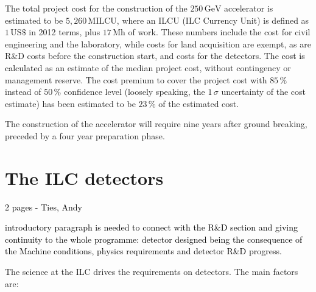 \documentclass[%
 reprint,
 amsmath,amssymb,
 aps,
]{revtex4-1}
\newcommand{\juan}[1]{\textcolor{black}{{#1}}}
\newcommand{\todo}[1]{\textcolor{black}{{#1}}}
\begin{document}
The total project cost for the construction of the $250\,{\mathrm{GeV}}$ accelerator is estimated to be $5,260\,{\mathrm{MILCU}}$, where an ILCU (ILC Currency Unit) is defined as $1\,{\mathrm{US\$}}$ in 2012 terms, plus $17\,{\mathrm{Mh}}$ of work. 
These numbers include the cost for civil engineering and the laboratory, while costs for land acquisition are exempt, as are R\&D costs before the construction start, and costs for the detectors.
The \juan{cost is calculated} as an estimate of the median project cost, without contingency or management reserve.
The cost premium to cover the project cost with $85\,\%$ instead of $50\,\%$ confidence level (loosely speaking, the $1\,\sigma$ uncertainty of the cost estimate) has been estimated to be $23\,\%$ of the estimated cost.

The construction of the accelerator will require nine years after ground breaking, preceded by a four year preparation phase.




\section{\label{sec:detect} The ILC detectors}

\todo{ 2 pages - Ties, Andy}

\todo{introductory paragraph is needed to connect with the R\&D section and giving continuity to the whole programme: detector designed being the consequence of the Machine conditions, physics requirements and detector R\&D progress.}

The science at the ILC drives the requirements on detectors. The main factors are:
\end{document}
